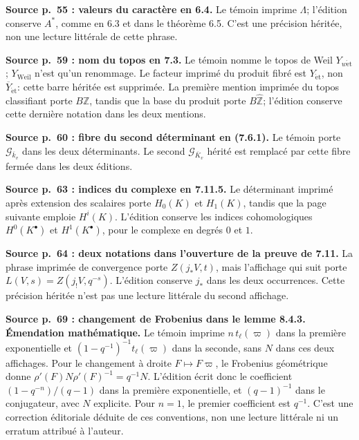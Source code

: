 \documentclass[10pt,letterpaper]{article}
\begin{document}
\begin{description}[style=nextline,leftmargin=2.6em,labelwidth=2.2em,font=\normalfont\bfseries]
\item[E49] \textbf{Source p.~55 : valeurs du caractère en 6.4.}
Le témoin imprime \(\Lambda\); l'édition conserve \(A^*\), comme en 6.3 et dans le théorème 6.5.
C'est une précision héritée, non une lecture littérale de cette phrase.
\item[E50] \textbf{Source p.~59 : nom du topos en 7.3.}
Le témoin nomme le topos de Weil \(Y_{w\mathrm{\acute et}}\); \(Y_{\mathrm{Weil}}\) n'est qu'un renommage.
Le facteur imprimé du produit fibré est \(Y_{\mathrm{\acute et}}\), non \(\overline Y_{\mathrm{\acute et}}\): cette barre héritée est supprimée.
La première mention imprimée du topos classifiant porte \(B\mathbb Z\), tandis que la base du produit porte \(B\widehat{\mathbb Z}\); l'édition conserve cette dernière notation dans les deux mentions.
\item[E51] \textbf{Source p.~60 : fibre du second déterminant en (7.6.1).}
Le témoin porte \(\mathcal G_{\overline k_v}\) dans les deux déterminants.
Le second \(\mathcal G_{\overline K_v}\) hérité est remplacé par cette fibre fermée dans les deux éditions.
\item[E52] \textbf{Source p.~63 : indices du complexe en 7.11.5.}
Le déterminant imprimé après extension des scalaires porte \(H_0(K)\) et \(H_1(K)\), tandis que la page suivante emploie \(H^i(K)\).
L'édition conserve les indices cohomologiques \(H^0(K^\bullet)\) et \(H^1(K^\bullet)\), pour le complexe en degrés \(0\) et \(1\).
\item[E53] \textbf{Source p.~64 : deux notations dans l'ouverture de la preuve de 7.11.}
La phrase imprimée de convergence porte \(Z(j_*V,t)\), mais l'affichage qui suit porte \(L(V,s)=Z(j_!V,q^{-s})\).
L'édition conserve \(j_*\) dans les deux occurrences. Cette précision héritée n'est pas une lecture littérale du second affichage.
\item[E54] \textbf{Source p.~69 : changement de Frobenius dans le lemme 8.4.3. Émendation mathématique.}
Le témoin imprime \(n\,t_\ell(\varpi)\) dans la première exponentielle et \((1-q^{-1})^{-1}t_\ell(\varpi)\) dans la seconde, sans \(N\) dans ces deux affichages. Pour le changement à droite \(F\mapsto F\varpi\), le Frobenius géométrique donne \(\rho'(F)N\rho'(F)^{-1}=q^{-1}N\). L'édition écrit donc le coefficient \((1-q^{-n})/(q-1)\) dans la première exponentielle, et \((q-1)^{-1}\) dans le conjugateur, avec \(N\) explicite. Pour \(n=1\), le premier coefficient est \(q^{-1}\). C'est une correction éditoriale déduite de ces conventions, non une lecture littérale ni un erratum attribué à l'auteur.

\end{description}
\end{document}
